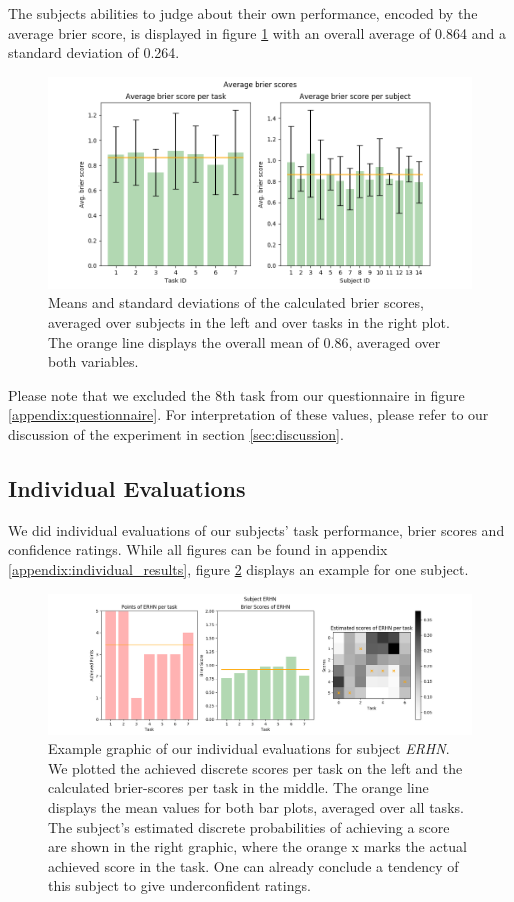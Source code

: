 \documentclass[../main/main.tex]{subfiles}
\begin{document}
\noindent The subjects abilities to judge about their own performance, encoded by the average brier score, is displayed in figure \ref{fig:avg_brier} with an overall average of 0.864 and a standard deviation of 0.264. 

\begin{figure}[H]
	\centering
	\includegraphics[width=\textwidth]{../assets/average_brier_scores.png}
	\caption{Means and standard deviations of the calculated brier scores, averaged over subjects in the left and over tasks in the right plot. The orange line displays the overall mean of 0.86, averaged over both variables.}
	\label{fig:avg_brier} 
\end{figure}

\noindent Please note that we excluded the 8th task from our questionnaire in figure \ref{appendix:questionnaire}. For interpretation of these values, please refer to our discussion of the experiment in section \ref{sec:discussion}.

\subsection{Individual Evaluations}
We did individual evaluations of our subjects' task performance, brier scores and confidence ratings. While all figures can be found in appendix \ref{appendix:individual_results}, figure \ref{fig:erhn_results} displays an example for one subject.

\begin{figure}[H]
	\centering
	\includegraphics[width=\textwidth]{../assets/ERHN_results.png}
	\caption{Example graphic of our individual evaluations for subject \textit{ERHN}. We plotted the achieved discrete scores per task on the left and the calculated brier-scores per task in the middle. The orange line displays the mean values for both bar plots, averaged over all tasks. The subject's estimated discrete probabilities of achieving a score are shown in the right graphic, where the orange x marks the actual achieved score in the task. One can already conclude a tendency of this subject to give underconfident ratings.}
	\label{fig:erhn_results} 
\end{figure}
\end{document}
